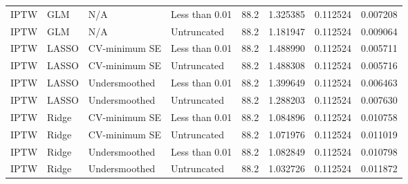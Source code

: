 \begin{longtable}[l]{llllllll}
IPTW & GLM & N/A & Less than 0.01 & 88.2 & 1.325385 & 0.112524 & 0.007208\\
IPTW & GLM & N/A & Untruncated & 88.2 & 1.181947 & 0.112524 & 0.009064\\
IPTW & LASSO & CV-minimum SE & Less than 0.01 & 88.2 & 1.488990 & 0.112524 & 0.005711\\
IPTW & LASSO & CV-minimum SE & Untruncated & 88.2 & 1.488308 & 0.112524 & 0.005716\\
IPTW & LASSO & Undersmoothed & Less than 0.01 & 88.2 & 1.399649 & 0.112524 & 0.006463\\
IPTW & LASSO & Undersmoothed & Untruncated & 88.2 & 1.288203 & 0.112524 & 0.007630\\
IPTW & Ridge & CV-minimum SE & Less than 0.01 & 88.2 & 1.084896 & 0.112524 & 0.010758\\
IPTW & Ridge & CV-minimum SE & Untruncated & 88.2 & 1.071976 & 0.112524 & 0.011019\\
IPTW & Ridge & Undersmoothed & Less than 0.01 & 88.2 & 1.082849 & 0.112524 & 0.010798\\
IPTW & Ridge & Undersmoothed & Untruncated & 88.2 & 1.032726 & 0.112524 & 0.011872\\
\bottomrule
\end{longtable}
